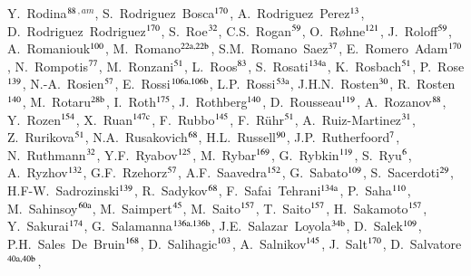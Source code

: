 \begin{flushleft}
Y.~Rodina$^\textrm{\scriptsize 88}$$^{,am}$,
S.~Rodriguez~Bosca$^\textrm{\scriptsize 170}$,
A.~Rodriguez~Perez$^\textrm{\scriptsize 13}$,
D.~Rodriguez~Rodriguez$^\textrm{\scriptsize 170}$,
S.~Roe$^\textrm{\scriptsize 32}$,
C.S.~Rogan$^\textrm{\scriptsize 59}$,
O.~R{\o}hne$^\textrm{\scriptsize 121}$,
J.~Roloff$^\textrm{\scriptsize 59}$,
A.~Romaniouk$^\textrm{\scriptsize 100}$,
M.~Romano$^\textrm{\scriptsize 22a,22b}$,
S.M.~Romano~Saez$^\textrm{\scriptsize 37}$,
E.~Romero~Adam$^\textrm{\scriptsize 170}$,
N.~Rompotis$^\textrm{\scriptsize 77}$,
M.~Ronzani$^\textrm{\scriptsize 51}$,
L.~Roos$^\textrm{\scriptsize 83}$,
S.~Rosati$^\textrm{\scriptsize 134a}$,
K.~Rosbach$^\textrm{\scriptsize 51}$,
P.~Rose$^\textrm{\scriptsize 139}$,
N.-A.~Rosien$^\textrm{\scriptsize 57}$,
E.~Rossi$^\textrm{\scriptsize 106a,106b}$,
L.P.~Rossi$^\textrm{\scriptsize 53a}$,
J.H.N.~Rosten$^\textrm{\scriptsize 30}$,
R.~Rosten$^\textrm{\scriptsize 140}$,
M.~Rotaru$^\textrm{\scriptsize 28b}$,
I.~Roth$^\textrm{\scriptsize 175}$,
J.~Rothberg$^\textrm{\scriptsize 140}$,
D.~Rousseau$^\textrm{\scriptsize 119}$,
A.~Rozanov$^\textrm{\scriptsize 88}$,
Y.~Rozen$^\textrm{\scriptsize 154}$,
X.~Ruan$^\textrm{\scriptsize 147c}$,
F.~Rubbo$^\textrm{\scriptsize 145}$,
F.~R\"uhr$^\textrm{\scriptsize 51}$,
A.~Ruiz-Martinez$^\textrm{\scriptsize 31}$,
Z.~Rurikova$^\textrm{\scriptsize 51}$,
N.A.~Rusakovich$^\textrm{\scriptsize 68}$,
H.L.~Russell$^\textrm{\scriptsize 90}$,
J.P.~Rutherfoord$^\textrm{\scriptsize 7}$,
N.~Ruthmann$^\textrm{\scriptsize 32}$,
Y.F.~Ryabov$^\textrm{\scriptsize 125}$,
M.~Rybar$^\textrm{\scriptsize 169}$,
G.~Rybkin$^\textrm{\scriptsize 119}$,
S.~Ryu$^\textrm{\scriptsize 6}$,
A.~Ryzhov$^\textrm{\scriptsize 132}$,
G.F.~Rzehorz$^\textrm{\scriptsize 57}$,
A.F.~Saavedra$^\textrm{\scriptsize 152}$,
G.~Sabato$^\textrm{\scriptsize 109}$,
S.~Sacerdoti$^\textrm{\scriptsize 29}$,
H.F-W.~Sadrozinski$^\textrm{\scriptsize 139}$,
R.~Sadykov$^\textrm{\scriptsize 68}$,
F.~Safai~Tehrani$^\textrm{\scriptsize 134a}$,
P.~Saha$^\textrm{\scriptsize 110}$,
M.~Sahinsoy$^\textrm{\scriptsize 60a}$,
M.~Saimpert$^\textrm{\scriptsize 45}$,
M.~Saito$^\textrm{\scriptsize 157}$,
T.~Saito$^\textrm{\scriptsize 157}$,
H.~Sakamoto$^\textrm{\scriptsize 157}$,
Y.~Sakurai$^\textrm{\scriptsize 174}$,
G.~Salamanna$^\textrm{\scriptsize 136a,136b}$,
J.E.~Salazar~Loyola$^\textrm{\scriptsize 34b}$,
D.~Salek$^\textrm{\scriptsize 109}$,
P.H.~Sales~De~Bruin$^\textrm{\scriptsize 168}$,
D.~Salihagic$^\textrm{\scriptsize 103}$,
A.~Salnikov$^\textrm{\scriptsize 145}$,
J.~Salt$^\textrm{\scriptsize 170}$,
D.~Salvatore$^\textrm{\scriptsize 40a,40b}$,
$$
\end{flushleft}
